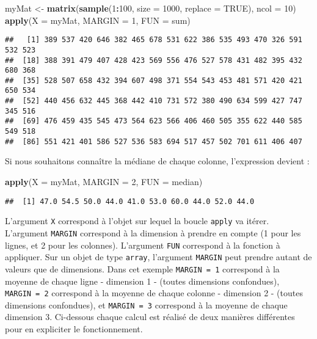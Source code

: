 \documentclass[]{book}
\newenvironment{Shaded}{\begin{snugshade}}{\end{snugshade}}
\newcommand{\KeywordTok}[1]{\textcolor[rgb]{0.13,0.29,0.53}{\textbf{#1}}}
\newcommand{\DataTypeTok}[1]{\textcolor[rgb]{0.13,0.29,0.53}{#1}}
\newcommand{\DecValTok}[1]{\textcolor[rgb]{0.00,0.00,0.81}{#1}}
\newcommand{\StringTok}[1]{\textcolor[rgb]{0.31,0.60,0.02}{#1}}
\newcommand{\OtherTok}[1]{\textcolor[rgb]{0.56,0.35,0.01}{#1}}
\newcommand{\OperatorTok}[1]{\textcolor[rgb]{0.81,0.36,0.00}{\textbf{#1}}}
\newcommand{\NormalTok}[1]{#1}
\theoremstyle{definition}
\theoremstyle{definition}
\theoremstyle{definition}
\theoremstyle{remark}
\begin{document}
\begin{Shaded}
\begin{Highlighting}[]
\NormalTok{myMat <-}\StringTok{ }\KeywordTok{matrix}\NormalTok{(}\KeywordTok{sample}\NormalTok{(}\DecValTok{1}\OperatorTok{:}\DecValTok{100}\NormalTok{, }\DataTypeTok{size =} \DecValTok{1000}\NormalTok{, }\DataTypeTok{replace =} \OtherTok{TRUE}\NormalTok{), }\DataTypeTok{ncol =} \DecValTok{10}\NormalTok{)}
\KeywordTok{apply}\NormalTok{(}\DataTypeTok{X =}\NormalTok{ myMat, }\DataTypeTok{MARGIN =} \DecValTok{1}\NormalTok{, }\DataTypeTok{FUN =}\NormalTok{ sum)}
\end{Highlighting}
\end{Shaded}

\begin{verbatim}
##   [1] 389 537 420 646 382 465 678 531 622 386 535 493 470 326 591 532 523
##  [18] 388 391 479 407 428 423 569 556 476 527 578 431 482 395 432 680 368
##  [35] 528 507 658 432 394 607 498 371 554 543 453 481 571 420 421 650 534
##  [52] 440 456 632 445 368 442 410 731 572 380 490 634 599 427 747 345 516
##  [69] 476 459 435 545 473 564 623 566 406 460 505 355 622 440 585 549 518
##  [86] 551 421 401 586 527 536 583 694 517 457 502 701 611 406 407
\end{verbatim}

Si nous souhaitons connaître la médiane de chaque colonne, l'expression
devient :

\begin{Shaded}
\begin{Highlighting}[]
\KeywordTok{apply}\NormalTok{(}\DataTypeTok{X =}\NormalTok{ myMat, }\DataTypeTok{MARGIN =} \DecValTok{2}\NormalTok{, }\DataTypeTok{FUN =}\NormalTok{ median)}
\end{Highlighting}
\end{Shaded}

\begin{verbatim}
##  [1] 47.0 54.5 50.0 44.0 41.0 53.0 60.0 44.0 52.0 44.0
\end{verbatim}

L'argument \texttt{X} correspond à l'objet sur lequel la boucle
\texttt{apply} va itérer. L'argument \texttt{MARGIN} correspond à la
dimension à prendre en compte (1 pour les lignes, et 2 pour les
colonnes). L'argument \texttt{FUN} correspond à la fonction à appliquer.
Sur un objet de type \texttt{array}, l'argument \texttt{MARGIN} peut
prendre autant de valeurs que de dimensions. Dans cet exemple
\texttt{MARGIN\ =\ 1} correspond à la moyenne de chaque ligne -
dimension 1 - (toutes dimensions confondues), \texttt{MARGIN\ =\ 2}
correspond à la moyenne de chaque colonne - dimension 2 - (toutes
dimensions confondues), et \texttt{MARGIN\ =\ 3} correspond à la moyenne
de chaque dimension 3. Ci-dessous chaque calcul est réalisé de deux
manières différentes pour en expliciter le fonctionnement.
\end{document}
